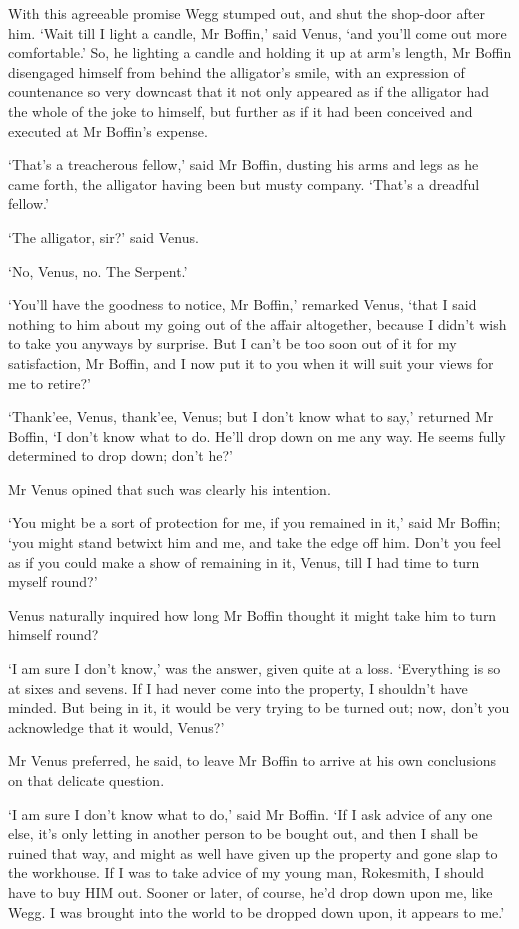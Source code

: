 With this agreeable promise Wegg stumped out, and shut the shop-door
after him. ‘Wait till I light a candle, Mr Boffin,’ said Venus, ‘and
you’ll come out more comfortable.’ So, he lighting a candle and holding
it up at arm’s length, Mr Boffin disengaged himself from behind the
alligator’s smile, with an expression of countenance so very downcast
that it not only appeared as if the alligator had the whole of the joke
to himself, but further as if it had been conceived and executed at Mr
Boffin’s expense.

‘That’s a treacherous fellow,’ said Mr Boffin, dusting his arms and legs
as he came forth, the alligator having been but musty company. ‘That’s a
dreadful fellow.’

‘The alligator, sir?’ said Venus.

‘No, Venus, no. The Serpent.’

‘You’ll have the goodness to notice, Mr Boffin,’ remarked Venus, ‘that I
said nothing to him about my going out of the affair altogether, because
I didn’t wish to take you anyways by surprise. But I can’t be too soon
out of it for my satisfaction, Mr Boffin, and I now put it to you when
it will suit your views for me to retire?’

‘Thank’ee, Venus, thank’ee, Venus; but I don’t know what to say,’
returned Mr Boffin, ‘I don’t know what to do. He’ll drop down on me any
way. He seems fully determined to drop down; don’t he?’

Mr Venus opined that such was clearly his intention.

‘You might be a sort of protection for me, if you remained in it,’ said
Mr Boffin; ‘you might stand betwixt him and me, and take the edge off
him. Don’t you feel as if you could make a show of remaining in it,
Venus, till I had time to turn myself round?’

Venus naturally inquired how long Mr Boffin thought it might take him to
turn himself round?

‘I am sure I don’t know,’ was the answer, given quite at a loss.
‘Everything is so at sixes and sevens. If I had never come into the
property, I shouldn’t have minded. But being in it, it would be very
trying to be turned out; now, don’t you acknowledge that it would,
Venus?’

Mr Venus preferred, he said, to leave Mr Boffin to arrive at his own
conclusions on that delicate question.

‘I am sure I don’t know what to do,’ said Mr Boffin. ‘If I ask advice of
any one else, it’s only letting in another person to be bought out, and
then I shall be ruined that way, and might as well have given up the
property and gone slap to the workhouse. If I was to take advice of my
young man, Rokesmith, I should have to buy HIM out. Sooner or later, of
course, he’d drop down upon me, like Wegg. I was brought into the world
to be dropped down upon, it appears to me.’

